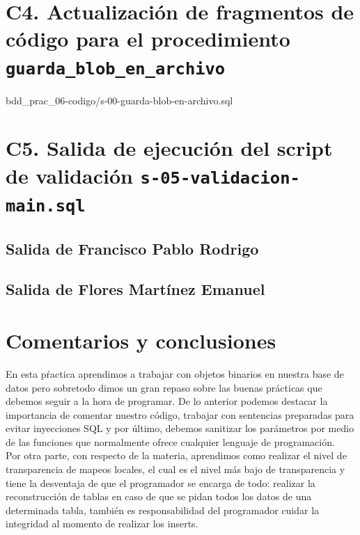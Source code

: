 \documentclass{article}
\newcommand{\codedir}{bdd_prac_06-codigo}
\begin{document}
\section*{C4. Actualización de fragmentos de código para el procedimiento 
  \texttt{guarda\_blob\_en\_archivo}}

  
  {\codedir/s-00-guarda-blob-en-archivo.sql}

\section*{C5. Salida de ejecución del script de validación 
  \texttt{s-05-validacion-main.sql}}

  \subsection*{Salida de Francisco Pablo Rodrigo}

  

  \subsection*{Salida de Flores Martínez Emanuel}

  

\section*{Comentarios y conclusiones}

En esta pŕactica aprendimos a trabajar con objetos binarios en nuestra base
de datos pero sobretodo dimos un gran repaso sobre las buenas prácticas
que debemos seguir a la hora de programar. De lo anterior podemos destacar la
importancia de comentar nuestro código, trabajar con sentencias preparadas
para evitar inyecciones SQL y por último, debemos sanitizar los parámetros
por medio de las funciones que normalmente ofrece cualquier lenguaje de
programación.\\

Por otra parte, con respecto de la materia, aprendimos como realizar el
nivel de transparencia de mapeos locales, el cual es el nivel más bajo de 
transparencia y tiene la desventaja de que el programador se encarga de todo:
realizar la reconstrucción de tablas en caso de que se pidan todos los 
datos de una determinada tabla, también es responsabilidad del programador 
cuidar la integridad al momento de realizar los inserts.\\
\end{document}
